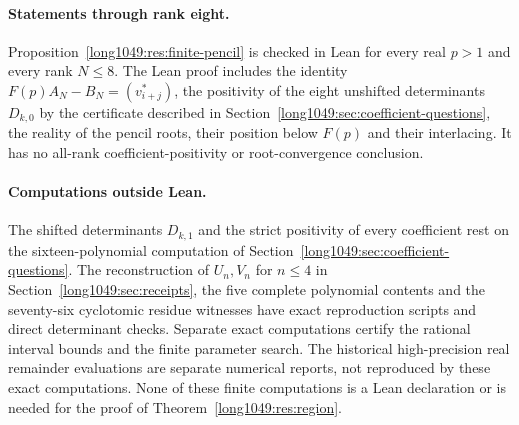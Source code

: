 \paragraph{Statements through rank eight.}
Proposition~\ref{long1049:res:finite-pencil} is checked in Lean for
every real $p>1$ and every rank $N\le8$. The Lean proof includes the
identity $F(p)A_N-B_N=(v^*_{i+j})$, the positivity of the eight unshifted
determinants $D_{k,0}$ by the certificate described in
Section~\ref{long1049:sec:coefficient-questions}, the reality of the
pencil roots, their position below $F(p)$ and their interlacing. It has
no all-rank coefficient-positivity or root-convergence conclusion.

\paragraph{Computations outside Lean.}
The shifted determinants $D_{k,1}$ and the strict positivity of every
coefficient rest on the sixteen-polynomial computation of
Section~\ref{long1049:sec:coefficient-questions}. The reconstruction of
$U_n,V_n$ for $n\le4$ in Section~\ref{long1049:sec:receipts}, the five
complete polynomial contents and the seventy-six cyclotomic residue
witnesses have exact reproduction scripts and direct determinant checks.
Separate exact computations certify the rational interval bounds and the
finite parameter search. The historical high-precision real remainder
evaluations are separate numerical reports, not reproduced by these exact
computations. None of these finite computations is a Lean declaration or
is needed for the proof of Theorem~\ref{long1049:res:region}.

